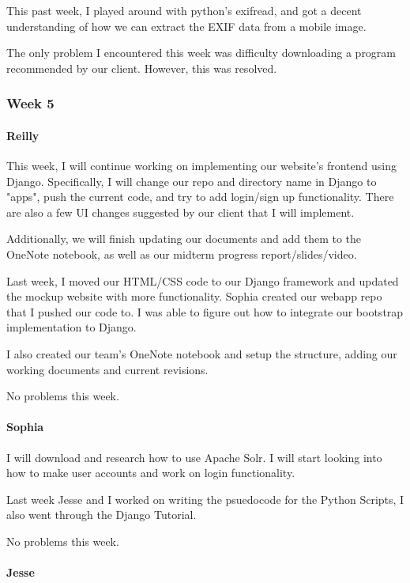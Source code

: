 \documentclass[onecolumn, draftclsnofoot,10pt, compsoc]{IEEEtran}
\begin{document}
\begin{flushleft}
 
This past week, I played around with python's exifread, and got a decent understanding of how we can extract the EXIF data from a mobile image.
 
 
The only problem I encountered this week was difficulty downloading a program recommended by our client. However, this was resolved.
 
\subsubsection{Week 5}
\paragraph{Reilly}
 
This week, I will continue working on implementing our website's frontend using Django. Specifically, I will change our repo and directory name in Django to "apps", push the current code, and try to add login/sign up functionality. There are also a few UI changes suggested by our client that I will implement.
 
Additionally, we will finish updating our documents and add them to the OneNote notebook, as well as our midterm progress report/slides/video.
 
 
Last week, I moved our HTML/CSS code to our Django framework and updated the mockup website with more functionality. Sophia created our webapp repo that I pushed our code to. I was able to figure out how to integrate our bootstrap implementation to Django.
 
I also created our team's OneNote notebook and setup the structure, adding our working documents and current revisions.
 
 
No problems this week.
 
\paragraph{Sophia}
 
I will download and research how to use Apache Solr. I will start looking into how to make user accounts and work on login functionality.
 
 
Last week Jesse and I worked on writing the psuedocode for the Python Scripts, I also went through the Django Tutorial.
 
 
No problems this week.
 
\paragraph{Jesse}
 

\end{flushleft}
\end{document}
